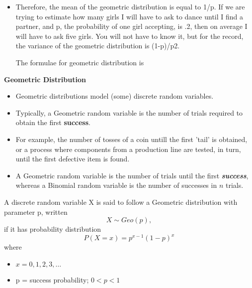 \documentclass[]{report}
\begin{document}
\begin{itemize}
	\item Therefore, the mean of the geometric distribution is equal to 1/p. If we are trying to estimate how many girls I will have to ask to dance until I find a partner, and p, the probability of one girl accepting, is .2, then on average I will have to ask five girls. 
	You will not have to know it, but for the record, the variance of the geometric distribution is (1-p)/p2. 
	
	
	The formulae for geometric distribution is
	
	
	
	
\end{itemize}






\noindent \textbf{Geometric Distribution}

\begin{itemize}
	
	\item Geometric distributions model (some) discrete random variables.
	\item  Typically, a Geometric random variable is the number of trials required to obtain the first \textbf{success}.
	\item For example, the number of tosses of a coin untill the first 'tail' is obtained, or a process where components from a production line are tested, in turn, until the first defective item is found.
	
\end{itemize}

\smallskip

\begin{itemize}
	\item A Geometric random variable is the number of trials until the first \textit{\textbf{success}}, whereas a Binomial random variable is the number of successes in $n$ trials.
\end{itemize}


A discrete random variable X is said to follow a Geometric distribution with parameter p, written \[X \sim Geo(p),\] if it has probability distribution
\[P(X=x) = p^{x-1}(1-p)^x\]
where
\begin{itemize}
	\item $x = 0, 1, 2, 3, \ldots$
	\item p = success probability; $0 < p < 1$
\end{itemize}
\end{document}
